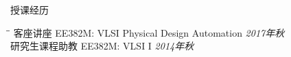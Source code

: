 \begin{rSection}{授课经历}

\begin{tabbing}
\hspace{3.3in}\= \hspace{3.1in}\= \kill
客座讲座 \> EE382M: VLSI Physical Design Automation \> {\em 2017年秋 } \\
研究生课程助教 \> EE382M: VLSI I \> {\em 2014年秋 }
\end{tabbing}

\end{rSection}
